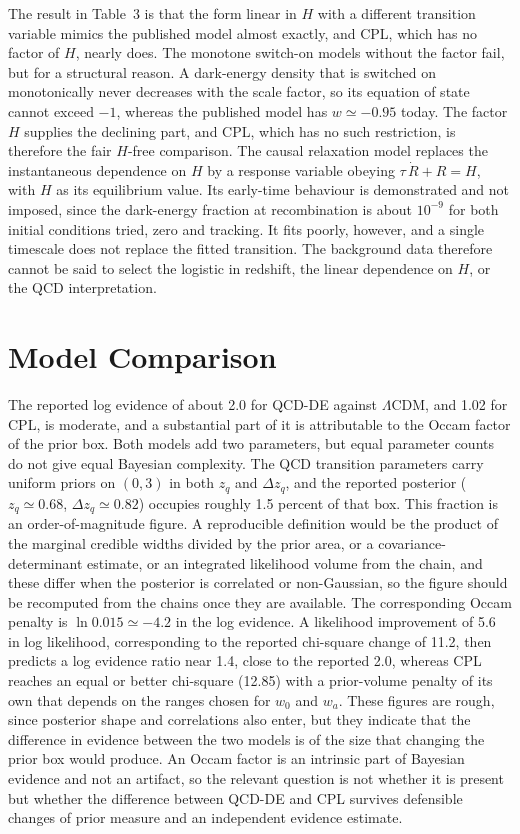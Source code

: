 \documentclass[11pt]{article}
\begin{document}
The result in Table~3 is that the form linear in $H$ with a different transition variable mimics the published model almost exactly, and CPL, which has no factor of $H$, nearly does. The monotone switch-on models without the factor fail, but for a structural reason. A dark-energy density that is switched on monotonically never decreases with the scale factor, so its equation of state cannot exceed $-1$, whereas the published model has $w\simeq-0.95$ today. The factor $H$ supplies the declining part, and CPL, which has no such restriction, is therefore the fair $H$-free comparison. The causal relaxation model replaces the instantaneous dependence on $H$ by a response variable obeying $\tau\,\dot R+R=H$, with $H$ as its equilibrium value. Its early-time behaviour is demonstrated and not imposed, since the dark-energy fraction at recombination is about $10^{-9}$ for both initial conditions tried, zero and tracking. It fits poorly, however, and a single timescale does not replace the fitted transition. The background data therefore cannot be said to select the logistic in redshift, the linear dependence on $H$, or the QCD interpretation.

\section{Model Comparison}

The reported log evidence of about 2.0 for QCD-DE against $\Lambda$CDM, and 1.02 for CPL, is moderate, and a substantial part of it is attributable to the Occam factor of the prior box. Both models add two parameters, but equal parameter counts do not give equal Bayesian complexity. The QCD transition parameters carry uniform priors on $(0,3)$ in both $z_q$ and $\Delta z_q$, and the reported posterior ($z_q\simeq0.68$, $\Delta z_q\simeq0.82$) occupies roughly 1.5 percent of that box. This fraction is an order-of-magnitude figure. A reproducible definition would be the product of the marginal credible widths divided by the prior area, or a covariance-determinant estimate, or an integrated likelihood volume from the chain, and these differ when the posterior is correlated or non-Gaussian, so the figure should be recomputed from the chains once they are available. The corresponding Occam penalty is $\ln 0.015\simeq-4.2$ in the log evidence. A likelihood improvement of 5.6 in log likelihood, corresponding to the reported chi-square change of 11.2, then predicts a log evidence ratio near 1.4, close to the reported 2.0, whereas CPL reaches an equal or better chi-square (12.85) with a prior-volume penalty of its own that depends on the ranges chosen for $w_0$ and $w_a$. These figures are rough, since posterior shape and correlations also enter, but they indicate that the difference in evidence between the two models is of the size that changing the prior box would produce. An Occam factor is an intrinsic part of Bayesian evidence and not an artifact, so the relevant question is not whether it is present but whether the difference between QCD-DE and CPL survives defensible changes of prior measure and an independent evidence estimate.
\end{document}
